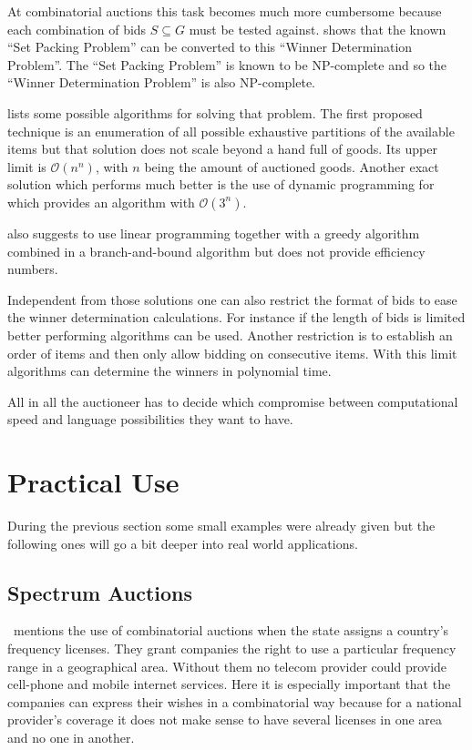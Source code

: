 \documentclass[a4paper]{paper}
\begin{document}
At combinatorial auctions this task becomes much more cumbersome because each combination of bids $S \subseteq G$ must be tested against. \cite[pp.~46--47]{BCE12} shows that the known ``Set Packing Problem'' can be converted to this ``Winner Determination Problem''. The ``Set Packing Problem'' is known to be NP-complete and so the ``Winner Determination Problem'' is also NP-complete.

\cite[Chapter~2]{San02} lists some possible algorithms for solving that problem. The first proposed technique is an enumeration of all possible exhaustive partitions of the available items but that solution does not scale beyond a hand full of goods. Its upper limit is $\mathcal O(n^n)$, with $n$ being the amount of auctioned goods. Another exact solution which performs much better is the use of dynamic programming for which \cite[Chapter~2.2]{San02} provides an algorithm with $\mathcal O(3^n)$.

\cite{Nis00} also suggests to use linear programming together with a greedy algorithm combined in a branch-and-bound algorithm but does not provide efficiency numbers.

Independent from those solutions one can also restrict the format of bids to ease the winner determination calculations. For instance if the length of bids is limited better performing algorithms can be used. Another restriction is to establish an order of items and then only allow bidding on consecutive items. With this limit algorithms can determine the winners in polynomial time.

All in all the auctioneer has to decide which compromise between computational speed and language possibilities they want to have.

\section{Practical Use}

During the previous section some small examples were already given but the following ones will go a bit deeper into real world applications.

\subsection{Spectrum Auctions}
\cite[p.~269]{BN07}~mentions the use of combinatorial auctions when the state assigns a country's frequency licenses. They grant companies the right to use a particular frequency range in a geographical area. Without them no telecom provider could provide cell-phone and mobile internet services. Here it is especially important that the companies can express their wishes in a combinatorial way because for a national provider's coverage it does not make sense to have several licenses in one area and no one in another.
\end{document}
